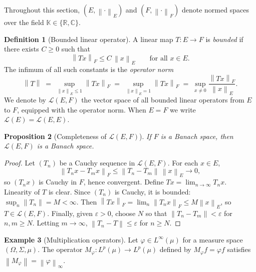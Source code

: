 \documentclass[a4paper,12pt]{book}
\newcommand{\R}{\mathbb{R}}
\newcommand{\C}{\mathbb{C}}
\newcommand{\K}{\mathbb{K}}
\newcommand{\norm}[1]{\left\| #1 \right\|}
\theoremstyle{definition}
\newtheorem{definition}{Definition}[chapter]
\newtheorem{example}[definition]{Example}
\theoremstyle{plain}
\newtheorem{proposition}[definition]{Proposition}
\theoremstyle{remark}
\begin{document}
Throughout this section, $(E,\norm{\cdot}_E)$ and $(F,\norm{\cdot}_F)$ denote
normed spaces over the field $\K\in\{\R,\C\}$.

\begin{definition}[Bounded linear operator]\label{def:bounded-op}
A linear map $T\colon E\to F$ is \emph{bounded} if there exists $C\geq 0$ such
that
\[
  \norm{Tx}_F \leq C\,\norm{x}_E \qquad \text{for all } x\in E.
\]
The infimum of all such constants is the \emph{operator norm}
\[
  \norm{T} \;=\; \sup_{\norm{x}_E\leq 1}\norm{Tx}_F
           \;=\; \sup_{\norm{x}_E = 1}\norm{Tx}_F
           \;=\; \sup_{x\neq 0}\frac{\norm{Tx}_F}{\norm{x}_E}.
\]
We denote by $\mathcal{L}(E,F)$ the vector
space of all bounded linear operators from $E$ to $F$, equipped with the
operator norm. When $E=F$ we write $\mathcal{L}(E)=\mathcal{L}(E,E)$.
\end{definition}

\begin{proposition}[Completeness of $\mathcal{L}(E,F)$]
\label{prop:LEF-complete}
If $F$ is a Banach space, then $\mathcal{L}(E,F)$ is a Banach space.
\end{proposition}

\begin{proof}
Let $(T_n)$ be a Cauchy sequence in $\mathcal{L}(E,F)$. For each $x\in E$,
\[
  \norm{T_n x - T_m x}_F \leq \norm{T_n - T_m}\,\norm{x}_E \to 0,
\]
so $(T_n x)$ is Cauchy in $F$, hence convergent. Define $Tx = \lim_{n\to\infty}T_n x$.
Linearity of $T$ is clear. Since $(T_n)$ is Cauchy, it is bounded:
$\sup_n\norm{T_n}=M<\infty$. Then $\norm{Tx}_F = \lim_n\norm{T_n x}_F \leq M\norm{x}_E$,
so $T\in\mathcal{L}(E,F)$. Finally, given $\varepsilon>0$, choose $N$ so that
$\norm{T_n-T_m}<\varepsilon$ for $n,m\geq N$. Letting $m\to\infty$,
$\norm{T_n - T}\leq\varepsilon$ for $n\geq N$.
\end{proof}

\begin{example}[Multiplication operators]\label{ex:mult-op}
Let $\varphi\in L^\infty(\mu)$ for a measure space $(\Omega,\Sigma,\mu)$.
The operator $M_\varphi\colon L^p(\mu)\to L^p(\mu)$ defined by
$M_\varphi f = \varphi f$ satisfies $\norm{M_\varphi} = \norm{\varphi}_\infty$.
\end{example}
\end{document}
